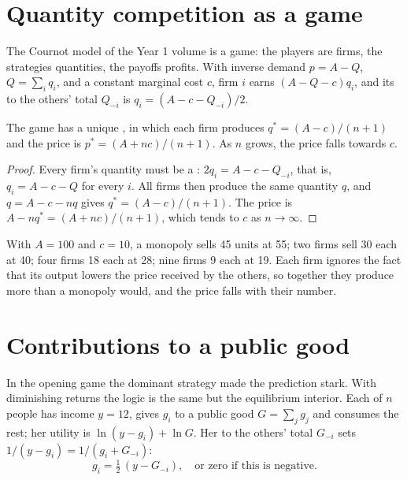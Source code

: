 \section{Quantity competition as a game}\label{sec:b2:static-games:cournot}

The Cournot model of the Year 1 volume is a game: the players are firms, the strategies quantities, the
payoffs profits. With inverse demand $p = A - Q$, $Q = \sum_i q_i$, and a constant marginal cost $c$, firm $i$
earns $(A - Q - c)q_i$, and its  to the others' total $Q_{-i}$ is $q_i = (A - c - Q_{-i})/2$.

\begin{proposition}\label{prop:b2:static-games:cournot}
The game has a unique , in which each firm produces $q^* = (A - c)/(n + 1)$ and the price is
$p^* = (A + nc)/(n + 1)$. As $n$ grows, the price falls towards $c$.
\end{proposition}

\begin{proof}
Every firm's quantity must be a : $2q_i = A - c - Q_{-i}$, that is, $q_i = A - c - Q$ for every
$i$. All firms then produce the same quantity $q$, and $q = A - c - nq$ gives $q^* = (A - c)/(n + 1)$. The price is
$A - nq^* = (A + nc)/(n + 1)$, which tends to $c$ as $n \to \infty$.
\end{proof}

With $A = 100$ and $c = 10$, a monopoly sells 45 units at 55; two firms sell 30 each at 40; four firms 18 each at 28;
nine firms 9 each at 19. Each firm ignores the fact that its output lowers the price received by the others,
so together they produce more than a monopoly would, and the price falls with their number.

\section{Contributions to a public good}\label{sec:b2:static-games:public-good}

In the opening game the dominant strategy made the prediction stark. With diminishing returns the logic is
the same but the equilibrium interior. Each of $n$ people has income $y = 12$, gives $g_i$ to a public good
$G = \sum_j g_j$ and consumes the rest; her utility is $\ln(y - g_i) + \ln G$. Her  to the others'
total $G_{-i}$ sets $1/(y - g_i) = 1/(g_i + G_{-i})$:
\begin{equation}\label{eq:b2:static-games:br}
g_i = \tfrac12\,(y - G_{-i}), \quad \text{or zero if this is negative.}
\end{equation}

